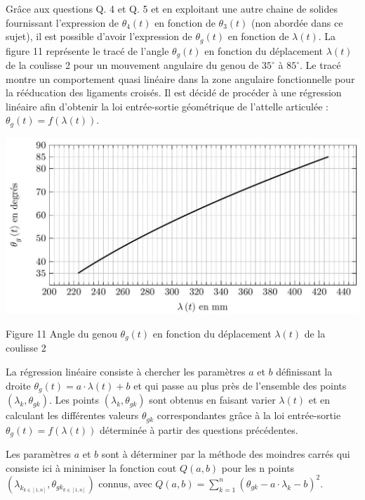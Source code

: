 \documentclass[10pt]{article}
\begin{document}
Grâce aux questions Q. 4 et Q. 5 et en exploitant une autre chaine de solides fournissant l'expression de $\theta_{4}(t)$ en fonction de $\theta_{3}(t)$ (non abordée dans ce sujet), il est possible d'avoir l'expression de $\theta_{g}(t)$ en fonction de $\lambda(t)$. La figure 11 représente le tracé de l'angle $\theta_{g}(t)$ en fonction du déplacement $\lambda(t)$ de la coulisse 2 pour un mouvement angulaire du genou de $35^{\circ}$ à $85^{\circ}$. Le tracé montre un comportement quasi linéaire dans la zone angulaire fonctionnelle pour la rééducation des ligaments croisés. Il est décidé de procéder à une régression linéaire afin d'obtenir la loi entrée-sortie géométrique de l'attelle articulée : $\theta_{g}(t)=f(\lambda(t))$.

\begin{center}
\includegraphics[max width=\textwidth]{2024_07_14_a83aebba33898893d39fg-07}
\end{center}

Figure 11 Angle du genou $\theta_{g}(t)$ en fonction du déplacement $\lambda(t)$ de la coulisse 2

La régression linéaire consiste à chercher les paramètres $a$ et $b$ définissant la droite $\theta_{g}(t)=a \cdot \lambda(t)+b$ et qui passe au plus près de l'ensemble des points $\left(\lambda_{k}, \theta_{g k}\right)$. Les points $\left(\lambda_{k}, \theta_{g k}\right)$ sont obtenus en faisant varier $\lambda(t)$ et en calculant les différentes valeurs $\theta_{g k}$ correspondantes grâce à la loi entrée-sortie $\theta_{g}(t)=f(\lambda(t))$ déterminée à partir des questions précédentes.

Les paramètres $a$ et $b$ sont à déterminer par la méthode des moindres carrés qui consiste ici à minimiser la fonction cout $Q(a, b)$ pour les n points $\left(\lambda_{k_{k \in[1, n]}}, \theta_{g k_{k \in[1, n]}}\right)$ connus, avec $Q(a, b)=\sum_{k=1}^{n}\left(\theta_{g k}-a \cdot \lambda_{k}-b\right)^{2}$.
\end{document}
